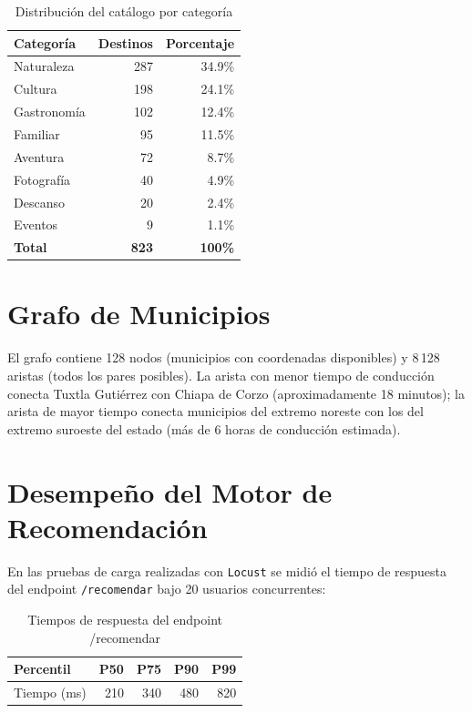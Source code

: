 \documentclass[12pt,letterpaper]{report}
\begin{document}
\begin{table}[H]
\centering
\caption{Distribución del catálogo por categoría}
\label{tab:catalogo_stats}
\begin{tabular}{lrr}
\toprule
\textbf{Categoría} & \textbf{Destinos} & \textbf{Porcentaje} \\
\midrule
Naturaleza    & 287 & 34.9\% \\
Cultura       & 198 & 24.1\% \\
Gastronomía   & 102 & 12.4\% \\
Familiar      &  95 & 11.5\% \\
Aventura      &  72 &  8.7\% \\
Fotografía    &  40 &  4.9\% \\
Descanso      &  20 &  2.4\% \\
Eventos       &   9 &  1.1\% \\
\midrule
\textbf{Total} & \textbf{823} & \textbf{100\%} \\
\bottomrule
\end{tabular}
\end{table}

\section{Grafo de Municipios}

El grafo contiene 128 nodos (municipios con coordenadas disponibles) y 8\,128 aristas
(todos los pares posibles). La arista con menor tiempo de conducción conecta Tuxtla Gutiérrez
con Chiapa de Corzo (aproximadamente 18 minutos); la arista de mayor tiempo conecta
municipios del extremo noreste con los del extremo suroeste del estado (más de 6 horas de
conducción estimada).

\section{Desempeño del Motor de Recomendación}

En las pruebas de carga realizadas con \texttt{Locust} se midió el tiempo de respuesta
del endpoint \texttt{/recomendar} bajo 20 usuarios concurrentes:

\begin{table}[H]
\centering
\caption{Tiempos de respuesta del endpoint /recomendar}
\label{tab:performance}
\begin{tabular}{lrrrr}
\toprule
\textbf{Percentil} & \textbf{P50} & \textbf{P75} & \textbf{P90} & \textbf{P99} \\
\midrule
Tiempo (ms) & 210 & 340 & 480 & 820 \\
\bottomrule
\end{tabular}
\end{table}
\end{document}
